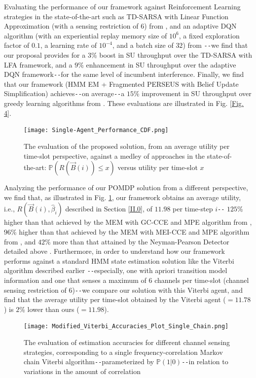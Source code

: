 \documentclass[12pt, draftcls, onecolumn]{IEEEtran}
\begin{document}
Evaluating the performance of our framework against Reinforcement Learning strategies in the state-of-the-art such as TD-SARSA with Linear Function Approximation (with a sensing restriction of $6$) from \cite{WCL:5}, and an adaptive DQN algorithm (with an experiential replay memory size of $10^{6}$, a fixed exploration factor of $0.1$, a learning rate of $10^{-4}$, and a batch size of $32$) from \cite{WCL:DQN}\texttt{-{}-}we find that our proposal provides for a $3$\% boost in SU throughput over the TD-SARSA with LFA framework, and a $9$\% enhancement in SU throughput over the adaptive DQN framework\texttt{-{}-}for the same level of incumbent interference. Finally, we find that our framework (HMM EM + Fragmented PERSEUS with Belief Update Simplification) achieves\texttt{-{}-}on average\texttt{-{}-}a $15$\% improvement in SU throughput over greedy learning algorithms from \cite{WCL:MIT}. These evaluations are illustrated in Fig. \ref{Fig. 4}.
\begin{figure} [htb]
    \centerline{
    \texttt{[image: Single-Agent\_Performance\_CDF.png]}}
    \caption{The evaluation of the proposed solution, from an average utility per time-slot perspective, against a medley of approaches in the state-of-the-art: $\mathbb{P}(R(\vec{B}(i)){\leq}x)$ versus utility per time-slot $x$}
    \label{Fig. 5}
\end{figure}

Analyzing the performance of our POMDP solution from a different perspective, we find that, as illustrated in Fig. \ref{Fig. 5}, our framework obtains an average utility, i.e., $R(\vec{B}(i),\hat{\beta}_{i})$ described in Section \ref{II.0}, of $11.98$ per time-step $i$\texttt{-{}-} $125$\% higher than that achieved by the MEM with GC-CCE and MPE algorithm from \cite{WCL:7}, $96$\% higher than that achieved by the MEM with MEI-CCE and MPE algorithm from \cite{WCL:7}, and $42$\% more than that attained by the Neyman-Pearson Detector detailed above \cite{WCL:11}. Furthermore, in order to understand how our framework performs against a standard HMM state estimation solution like the Viterbi algorithm described earlier \cite{WCL:6}\texttt{-{}-}especially, one with apriori transition model information and one that senses a maximum of $6$ channels per time-slot (channel sensing restriction of $6$)\texttt{-{}-}we compare our solution with this Viterbi agent, and find that the average utility per time-slot obtained by the Viterbi agent (${=}11.78$) is $2$\% lower than ours (${=}11.98$).
\begin{figure} [htb]
    \centerline{
    \texttt{[image: Modified\_Viterbi\_Accuracies\_Plot\_Single\_Chain.png]}}
    \caption{The evaluation of estimation accuracies for different channel sensing strategies, corresponding to a single frequency-correlation Markov chain Viterbi algorithm\texttt{-{}-}parameterized by $\mathbb{P}(1|0)$\texttt{-{}-}in relation to variations in the amount of correlation}
    \label{Fig. 6}
\end{figure}
\end{document}
